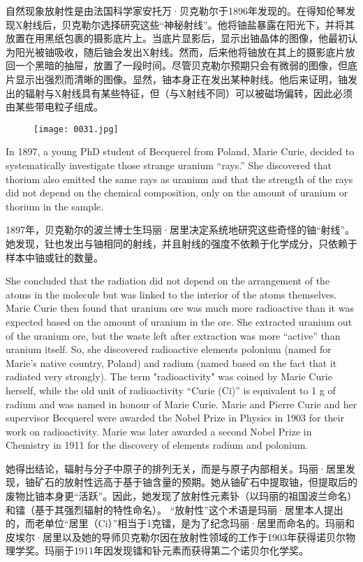 \documentclass[dvipsnames, svgnames,a4paper,11pt]{article}
\begin{document}
自然现象放射性是由法国科学家安托万·贝克勒尔于1896年发现的。在得知伦琴发现X射线后，贝克勒尔选择研究这些“神秘射线”。他将铀盐暴露在阳光下，并将其放置在用黑纸包裹的摄影底片上。当底片显影后，显示出铀晶体的图像，他最初认为阳光被铀吸收，随后铀会发出X射线。然而，后来他将铀放在其上的摄影底片放回一个黑暗的抽屉，放置了一段时间。尽管贝克勒尔预期只会有微弱的图像，但底片显示出强烈而清晰的图像。显然，铀本身正在发出某种射线。他后来证明，铀发出的辐射与X射线具有某些特征，但（与X射线不同）可以被磁场偏转，因此必须由某些带电粒子组成。

\begin{figure}[htbp]
      \centering
      \texttt{[image: 0031.jpg]}
       \label{fig17}
\end{figure}

In 1897, a young PhD student of Becquerel from Poland, Marie Curie, decided to systematically investigate those strange uranium “rays.” She discovered that thorium also emitted the same rays as uranium and that the strength of the rays did not depend on the chemical composition, only on the amount of uranium or thorium in the sample.

1897年，贝克勒尔的波兰博士生玛丽·居里决定系统地研究这些奇怪的铀“射线”。她发现，钍也发出与铀相同的射线，并且射线的强度不依赖于化学成分，只依赖于样本中铀或钍的数量。

She concluded that the radiation did not depend on the arrangement of the atoms in the molecule but was linked to the interior of the atoms themselves. Marie Curie then found that uranium ore was much more radioactive than it was expected based on the amount of uranium in the ore. She extracted uranium out of the uranium ore, but the waste left after extraction was more “active” than uranium itself. So, she discovered radioactive elements polonium (named for Marie’s native country, Poland) and radium (named based on the fact that it radiated very strongly). The term "radioactivity" was coined by Marie Curie herself, while the old unit of radioactivity “Curie (Ci)” is equivalent to 1 g of radium and was named in honour of Marie Curie. Marie and Pierre Curie and her supervisor Becquerel were awarded the Nobel Prize in Physics in 1903 for their work on radioactivity. Marie was later awarded a second Nobel Prize in Chemistry in 1911 for the discovery of elements radium and polonium.

她得出结论，辐射与分子中原子的排列无关，而是与原子内部相关。玛丽·居里发现，铀矿石的放射性远高于基于铀含量的预期。她从铀矿石中提取铀，但提取后的废物比铀本身更“活跃”。因此，她发现了放射性元素钋（以玛丽的祖国波兰命名）和镭（基于其强烈辐射的特性命名）。 “放射性”这个术语是玛丽·居里本人提出的，而老单位“居里（Ci）”相当于1克镭，是为了纪念玛丽·居里而命名的。玛丽和皮埃尔·居里以及她的导师贝克勒尔因在放射性领域的工作于1903年获得诺贝尔物理学奖。玛丽于1911年因发现镭和钋元素而获得第二个诺贝尔化学奖。
\end{document}
